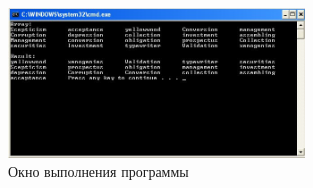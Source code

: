 \documentclass[a4paper,14pt]{article}
\begin{document}
\begin{figure}[h] %
    \centering %
    \includegraphics[width=0.7\textwidth]{exe.jpg} %
    \caption{Окно выполнения программы} %
    \label{fig:exe} %
\end{figure}
\end{document}
